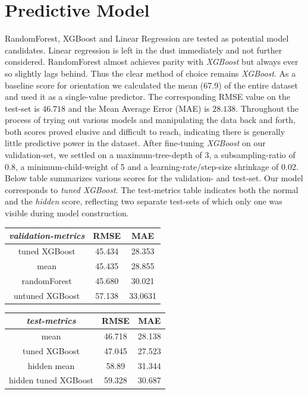 \documentclass[11pt, oneside]{article}   	%
\begin{document}
\section{Predictive Model}
RandomForest, XGBoost and Linear Regression are tested as potential model candidates. Linear regression is left in the dust immediately and not further considered. RandomForest almost achieves parity with \textit{XGBoost} but always ever so slightly lags behind. Thus the clear method of choice remains \textit{XGBoost}.
\newline
As a baseline score for orientation we calculated the mean (67.9) of the entire dataset and used it as a single-value predictor. The corresponding RMSE value on the test-set is $46.718$ and the Mean Average Error (MAE) is $28.138$. Throughout the process of trying out various models and manipulating the data back and forth, both scores proved elusive and difficult to reach, indicating there is generally little predictive power in the dataset. \newline
After fine-tuning \textit{XGBoost} on our validation-set, we settled on a maximum-tree-depth of 3, a subsampling-ratio of 0.8, a minimum-child-weight of 5 and a learning-rate/step-size shrinkage of 0.02.\newline
Below table summarizes various scores for the validation- and test-set. Our model corresponds to \textit{tuned XGBoost}.
The test-metrics table indicates both the normal and the \textit{hidden} score, reflecting two separate test-sets of which only one was visible during model construction.
\newline
\begin{center}
\begin{tabular}{c | c c}
\textit{validation-metrics}&RMSE&MAE \\
\hline
tuned XGBoost&45.434&28.353\\
mean&45.435&28.855\\
randomForest&45.680&30.021\\
untuned XGBoost&57.138&33.0631
\end{tabular}
\end{center}

\begin{center}
\begin{tabular}{c | c c}
\textit{test-metrics}&RMSE&MAE \\
\hline
mean&46.718&28.138\\
tuned XGBoost&47.045&27.523\\
hidden mean&58.89&31.344\\
hidden tuned XGBoost&59.328&30.687
\end{tabular}
\end{center}
\end{document}
